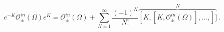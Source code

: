 \begin{equation}
e^{-K}\mathcal{O}_{\pm}^{in}(\Omega)e^K=
\mathcal{O}_{\pm}^{in}(\Omega)+
\sum_{N=1}^{\infty}\frac{(-1)^N}{N!}
\overbrace{[K,[K,\mathcal{O}^{in}_{\pm}
(\Omega)],\dots,]]}^N \ .
\end{equation}

